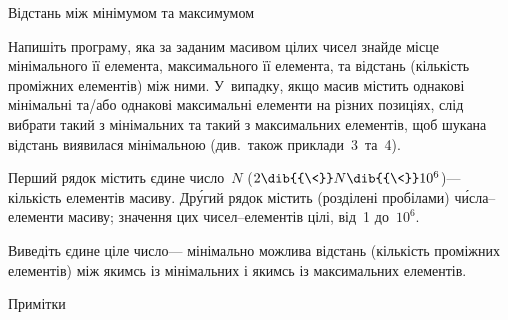 ﻿\begin{problemAllDefault}{Відстань між мінімумом та максимумом}

Напишіть програму, яка за заданим масивом цілих чисел знайде місце мінімального її елемента, максимального її елемента, та відстань (кількість проміжних елементів) між ними. У~випадку, якщо масив містить однакові мінімальні та\slash{}або однакові максимальні елементи на різних позиціях, слід вибрати такий з мінімальних та такий з максимальних елементів, щоб шукана відстань виявилася мінімальною (див.~також приклади~3~та~4).

\InputFile
Перший рядок містить єдине число~$N$ ($2\dib{{\<}}N\dib{{\<}}10^6$)\nolinebreak[3] --- кількість елементів масиву. Др\'{у}гий рядок містить (розділені пробілами) ч\'{и}сла--елементи масиву; значення цих чисел--елементів цілі, від~1 до~$10^6$.

\OutputFile
Виведіть єдине ціле число\nolinebreak[3] --- мінімально можлива відстань (кількість проміжних елементів) між якимсь із мінімальних і якимсь із максимальних елементів.

\Example

\noindent\hspace*{-1em}\begin{exampleSimpleThree}{7.5em}{5em}{10cm}{Примітки}
%
%
%
%
\end{exampleSimpleThree}


\end{problemAllDefault}
